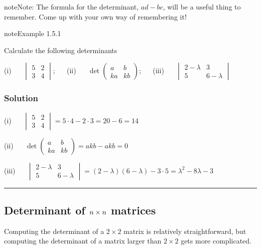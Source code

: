 \documentclass[letterpaper,10pt,english]{jupyterBook}
\begin{document}
\begin{sphinxadmonition}{note}{Note:}
\sphinxAtStartPar
The formula for the determinant, \(ad-bc\), will be a useful thing to remember. Come up with your own way of remembering it!
\end{sphinxadmonition}
\label{_pages/1.4_Determinants:2x2-determinant-example}
\begin{sphinxadmonition}{note}{Example 1.5.1}



\sphinxAtStartPar
Calculate the following determinants

\sphinxAtStartPar
(i)   \(\begin{vmatrix} 5 & 2 \\ 3 & 4 \end{vmatrix}\);  
(ii)   \(\det \begin{pmatrix} a & b \\ ka & kb \end{pmatrix}\);  
(iii)   \(\begin{vmatrix} 2-\lambda & 3 \\ 5 & 6 - \lambda \end{vmatrix}\)
\subsubsection*{Solution}

\sphinxAtStartPar
(i)   \( \begin{vmatrix} 5 & 2 \\ 3 & 4 \end{vmatrix} = 5 \cdot 4 - 2 \cdot 3 = 20 - 6 = 14 \)

\sphinxAtStartPar
(ii)   \( \det \begin{pmatrix} a & b \\ ka & kb \end{pmatrix} = akb - akb = 0 \)

\sphinxAtStartPar
(iii)   \( \begin{vmatrix} 2-\lambda & 3 \\ 5 & 6 - \lambda \end{vmatrix} = (2-\lambda)(6-\lambda) - 3 \cdot 5 = \lambda^2 - 8\lambda - 3 \)
\end{sphinxadmonition}


\bigskip\hrule\bigskip


\ignorespaces 

\subsection{Determinant of \protect\(n \times n\protect\) matrices}
\label{\detokenize{_pages/1.4_Determinants:determinant-of-n-times-n-matrices}}\label{\detokenize{_pages/1.4_Determinants:index-3}}
\sphinxAtStartPar
Computing the determinant of a \(2\times 2\) matrix is relatively straightforward, but computing the determinant of a matrix larger than \(2\times 2\) gets more complicated.
\end{document}
